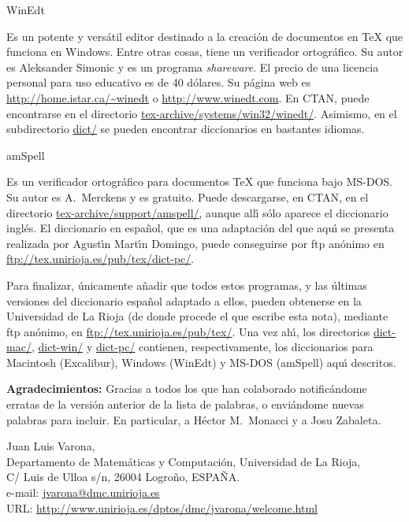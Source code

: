 \documentclass[a4paper,12pt]{article}
\begin{document}
\begin{subsection}{WinEdt}

Es un potente y vers\'atil editor destinado a la creaci\'on de documentos en
\TeX{} que funciona en Windows. Entre otras cosas, tiene un verificador
ortogr\'afico. Su autor es Aleksander Simonic y es un programa
\textit{shareware}. El precio de una licencia personal para uso educativo es
de 40 d\'olares. Su p\'agina web es \url{http://home.istar.ca/~winedt} o
\url{http://www.winedt.com}. En CTAN, puede encontrarse en el directorio
\url{tex-archive/systems/win32/winedt/}. Asimismo, en el subdirectorio
\url{dict/} se pueden encontrar diccionarios en bastantes idiomas.

\end{subsection}

\begin{subsection}{amSpell}

Es un verificador ortogr\'afico para documentos \TeX{}
que funciona bajo MS-DOS. Su autor es A.~Merckens y es gratuito. Puede
descargarse, en CTAN, en el directorio \url{tex-archive/support/amspell/},
aunque all\'{\i} s\'olo aparece el diccionario ingl\'es. El diccionario en
espa\~nol, que es una adaptaci\'on del que aqu\'{\i} se presenta realizada por
Agust\'{\i}n Mart\'{\i}n Domingo, puede conseguirse por ftp an\'onimo en
\url{ftp://tex.unirioja.es/pub/tex/dict-pc/}.

\end{subsection}
\bigskip

Para finalizar, \'unicamente a\~nadir que todos estos programas, y las
\'ultimas versiones del diccionario espa\~nol adaptado a ellos, pueden
obtenerse en la Universidad de La Rioja (de donde procede el que escribe esta
nota), mediante ftp an\'onimo, en
\url{ftp://tex.unirioja.es/pub/tex/}. Una vez ah\'{\i}, los directorios
\url{dict-mac/}, \url{dict-win/} y \url{dict-pc/} contienen,
respectivamente, los diccionarios para Macintosh (Excalibur), Windows (WinEdt)
y MS-DOS (amSpell) aqu\'{\i} descritos.

\bigskip

\noindent\textbf{Agradecimientos:}
Gracias a todos los que han colaborado notific\'andome erratas de la versi\'on
anterior de la lista de palabras, o envi\'andome nuevas palabras para incluir.
En particular, a H\'ector M.~Monacci y a Josu Zabaleta.

\bigskip

\begin{flushright}
{\small Juan Luis Varona,\\
Departamento de Matem\'aticas y Computaci\'on,
Universidad de La Rioja,\\
C/ Luis de Ulloa s/n, 26004 Logro\~no, ESPA\~NA.\\
e-mail: \href{mailto:jvarona@dmc.unirioja.es}{jvarona@dmc.unirioja.es}\\
URL: \url{http://www.unirioja.es/dptos/dmc/jvarona/welcome.html}}
\end{flushright}
\end{document}
